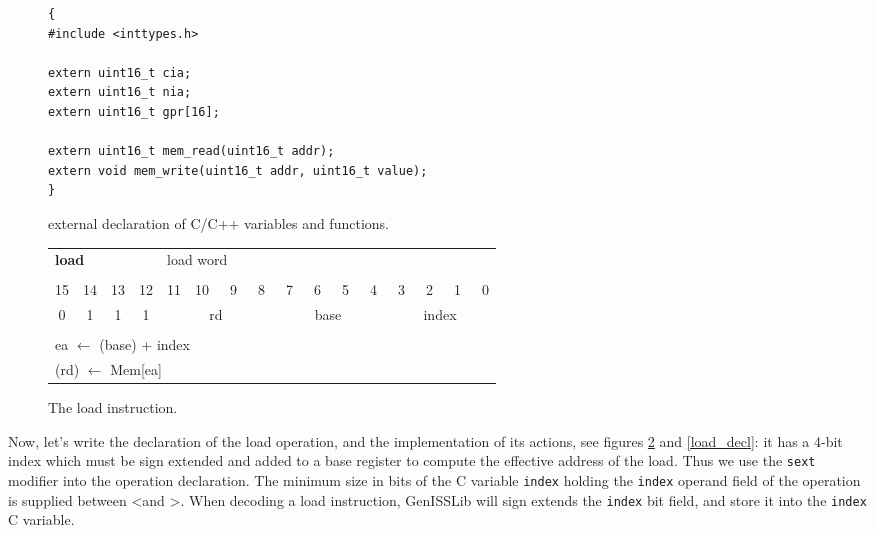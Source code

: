 \begin{figure}[ht]
\begin{center}
\begin{verbatim}
{
#include <inttypes.h>

extern uint16_t cia;
extern uint16_t nia;
extern uint16_t gpr[16];

extern uint16_t mem_read(uint16_t addr);
extern void mem_write(uint16_t addr, uint16_t value);
}
\end{verbatim}
\caption{external declaration of C/C++ variables and functions.}
\label{c_decl}
\end{center}
\end{figure}

\begin{figure}[h!tb]
\begin{center}
	\begin{tabular}{cccccccccccccccc}
		\multicolumn{4}{l}{\Large{\bf{load}}} & \multicolumn{12}{l}{load word}\\
		\multicolumn{16}{c}{}\\
		15  &  14  &  13  &  12  &  11  &  10  &  ~9  & ~8  &  ~7  &  ~6  &  ~5  &  ~4  &  ~3  &  ~2  &  ~1  &  ~0 \\
		\hline
		\multicolumn{1}{|c|}{0}  & \multicolumn{1}{|c|}{1} & \multicolumn{1}{|c|}{1} & \multicolumn{1}{|c|}{1} & \multicolumn{4}{|c|}{rd} & \multicolumn{4}{|c|}{base} & \multicolumn{4}{|c|}{index}\\
		\hline
		\multicolumn{16}{c}{}\\
		\multicolumn{16}{l}{ea $\leftarrow$ (base) + index}\\
		\multicolumn{16}{l}{(rd) $\leftarrow$ Mem[ea]}\\
	\end{tabular}
\end{center}
\caption{The load instruction.}
\label{load_instr}
\end{figure}

Now, let's write the declaration of the load operation, and the implementation of its actions, see figures \ref{load_instr} and \ref{load_decl}: it has a 4-bit index which
must be sign extended and added to a base register to compute the effective address of the load.
Thus we use the \texttt{sext} modifier into the operation declaration. The minimum size in bits of the C variable \texttt{index} holding the \texttt{index} operand field of the operation is supplied between \textless and \textgreater. When decoding a load instruction, GenISSLib will sign extends the \texttt{index} bit field, and store it into the \texttt{index} C variable.

